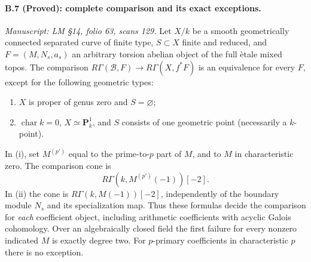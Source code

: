 \paragraph{B.7 (Proved): complete comparison and its exact exceptions.}\label{B7}
\textit{Manuscript: LM \S14, folio 63, scans 129.}
Let $X/k$ be a smooth geometrically connected separated curve of
finite type, $S\subset X$ finite and reduced, and $F=(M,N_s,a_s)$
an arbitrary torsion abelian object of the full \`etale mixed
topos. The comparison $R\Gamma(\mathcal B,F)\to R\Gamma(X,f^*F)$
is an equivalence for every $F$, except for the following geometric
types:
\begin{enumerate}[label=(\roman*)]
\item $X$ is proper of genus zero and $S=\varnothing$;
\item $\operatorname{char}k=0$, $X\simeq\mathbf P^1_k$, and
$S$ consists of one geometric point (necessarily a $k$-point).
\end{enumerate}
In (i), set $M^{(p')}$ equal to the prime-to-$p$ part of $M$,
and to $M$ in characteristic zero. The comparison cone is
\begin{equation}\label{eq:B-genuszero}
 R\Gamma(k,M^{(p')}(-1))[-2].
\end{equation}
In (ii) the cone is $R\Gamma(k,M(-1))[-2]$, independently of
the boundary module $N_s$ and its specialization map. Thus these
formulas decide the comparison for \emph{each} coefficient object,
including arithmetic coefficients with acyclic Galois cohomology.
Over an algebraically closed field the first failure for every
nonzero indicated $M$ is exactly degree two. For $p$-primary
coefficients in characteristic $p$ there is no exception.

